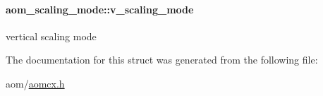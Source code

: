 \paragraph[{\texorpdfstring{v\+\_\+scaling\+\_\+mode}{v_scaling_mode}}]{ aom\+\_\+scaling\+\_\+mode\+::v\+\_\+scaling\+\_\+mode}\hypertarget{structaom__scaling__mode_a3b535e8839e2bdf05afcd15ec6daa6ce}{}\label{structaom__scaling__mode_a3b535e8839e2bdf05afcd15ec6daa6ce}
vertical scaling mode 

The documentation for this struct was generated from the following file\+:\begin{DoxyCompactItemize}
\item 
aom/\hyperlink{aomcx_8h}{aomcx.\+h}\end{DoxyCompactItemize}
